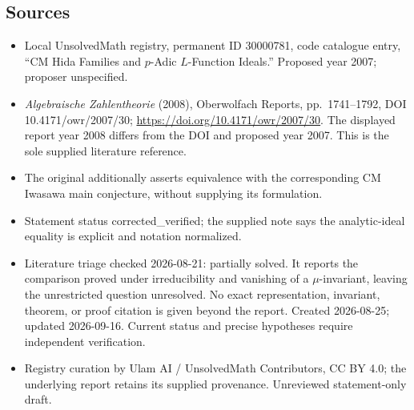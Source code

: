 \documentclass[11pt]{article}
\begin{document}
\subsection{Sources}
\begin{itemize}
\item Local UnsolvedMath registry, permanent ID 30000781, code catalogue entry, ``CM Hida Families and $p$-Adic $L$-Function Ideals.'' Proposed year 2007; proposer unspecified.
\item \emph{Algebraische Zahlentheorie} (2008), Oberwolfach Reports, pp.\ 1741--1792, DOI 10.4171/owr/2007/30; \url{https://doi.org/10.4171/owr/2007/30}. The displayed report year 2008 differs from the DOI and proposed year 2007. This is the sole supplied literature reference.
\item The original additionally asserts equivalence with the corresponding CM Iwasawa main conjecture, without supplying its formulation.
\item Statement status corrected\_verified; the supplied note says the analytic-ideal equality is explicit and notation normalized.
\item Literature triage checked 2026-08-21: partially solved. It reports the comparison proved under irreducibility and vanishing of a $\mu$-invariant, leaving the unrestricted question unresolved. No exact representation, invariant, theorem, or proof citation is given beyond the report. Created 2026-08-25; updated 2026-09-16. Current status and precise hypotheses require independent verification.
\item Registry curation by Ulam AI / UnsolvedMath Contributors, CC BY 4.0; the underlying report retains its supplied provenance. Unreviewed statement-only draft.
\end{itemize}
\end{document}
